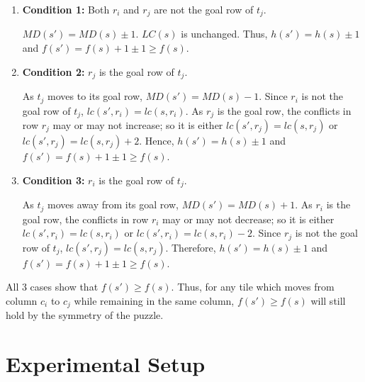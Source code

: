 \documentclass[runningheads]{llncs}
\begin{document}
\begin{enumerate}
    \item \textbf{Condition 1:} Both \( r_i \) and \( r_j \) are not the goal row of \( t_j \).
    
        \( MD(s') = MD(s) \pm 1 \). \( LC(s) \) is unchanged. Thus, \( h(s') = h(s) \pm 1 \) and \( f(s') = f(s) + 1 \pm 1 \geq f(s) \).
    
    \item \textbf{Condition 2:} \( r_j \) is the goal row of \( t_j \).
        
        As \( t_j \) moves to its goal row, \( MD(s') = MD(s) - 1 \). Since \( r_i \) is not the goal row of \( t_j \), \( lc(s', r_i) = lc(s, r_i) \). 
        As \( r_j \) is the goal row, the conflicts in row \( r_j \) may or may not increase; so it is either \( lc(s', r_j) = lc(s, r_j) \) or \( lc(s', r_j) = lc(s, r_j) + 2 \). 
        Hence, \( h(s') = h(s) \pm 1 \) and \( f(s') = f(s) + 1 \pm 1 \geq f(s) \).

    \item \textbf{Condition 3:} \( r_i \) is the goal row of \( t_j \).
    
        As \( t_j \) moves away from its goal row, \( MD(s') = MD(s) + 1 \). 
        As \( r_i \) is the goal row, the conflicts in row \( r_i \) may or may not decrease; so it is either \( lc(s', r_i) = lc(s, r_i) \) or \( lc(s', r_i) = lc(s, r_i) - 2 \). 
        Since \( r_j \) is not the goal row of \( t_j \), \( lc(s', r_j) = lc(s, r_j) \). 
        Therefore, \( h(s') = h(s) \pm 1 \) and \( f(s') = f(s) + 1 \pm 1 \geq f(s) \).
\end{enumerate}
All 3 cases show that \( f(s') \geq f(s) \). Thus, for any tile which moves from column \( c_i \) to \( c_j \) while remaining in the same column, \( f(s') \geq f(s) \) will still hold by the symmetry of the puzzle.


\section{Experimental Setup}
\end{document}
